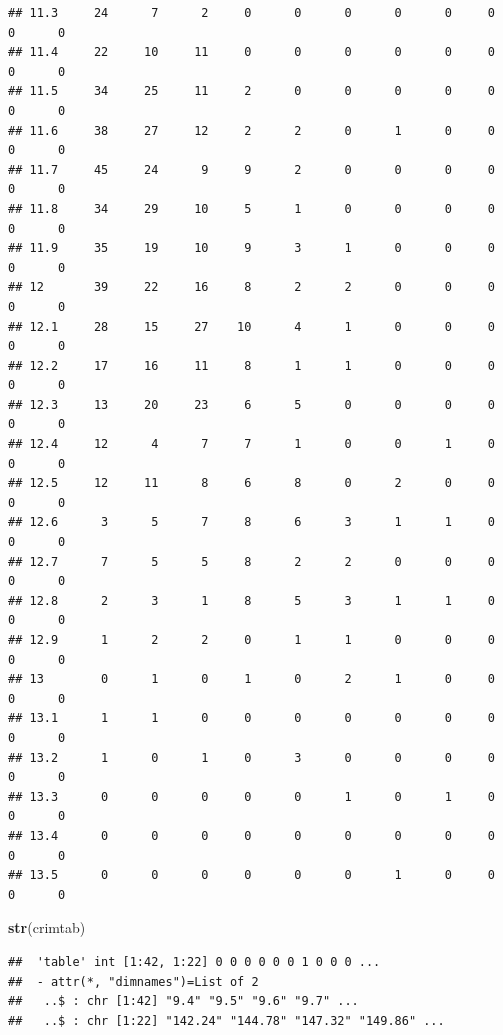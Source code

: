 \documentclass[
]{article}
\newenvironment{Shaded}{\begin{snugshade}}{\end{snugshade}}
\newcommand{\KeywordTok}[1]{\textcolor[rgb]{0.13,0.29,0.53}{\textbf{#1}}}
\newcommand{\NormalTok}[1]{#1}
\begin{document}
\begin{verbatim}
## 11.3     24      7      2     0      0      0      0      0     0      0      0
## 11.4     22     10     11     0      0      0      0      0     0      0      0
## 11.5     34     25     11     2      0      0      0      0     0      0      0
## 11.6     38     27     12     2      2      0      1      0     0      0      0
## 11.7     45     24      9     9      2      0      0      0     0      0      0
## 11.8     34     29     10     5      1      0      0      0     0      0      0
## 11.9     35     19     10     9      3      1      0      0     0      0      0
## 12       39     22     16     8      2      2      0      0     0      0      0
## 12.1     28     15     27    10      4      1      0      0     0      0      0
## 12.2     17     16     11     8      1      1      0      0     0      0      0
## 12.3     13     20     23     6      5      0      0      0     0      0      0
## 12.4     12      4      7     7      1      0      0      1     0      0      0
## 12.5     12     11      8     6      8      0      2      0     0      0      0
## 12.6      3      5      7     8      6      3      1      1     0      0      0
## 12.7      7      5      5     8      2      2      0      0     0      0      0
## 12.8      2      3      1     8      5      3      1      1     0      0      0
## 12.9      1      2      2     0      1      1      0      0     0      0      0
## 13        0      1      0     1      0      2      1      0     0      0      0
## 13.1      1      1      0     0      0      0      0      0     0      0      0
## 13.2      1      0      1     0      3      0      0      0     0      0      0
## 13.3      0      0      0     0      0      1      0      1     0      0      0
## 13.4      0      0      0     0      0      0      0      0     0      0      0
## 13.5      0      0      0     0      0      0      1      0     0      0      0
\end{verbatim}

\begin{Shaded}
\begin{Highlighting}[]
\KeywordTok{str}\NormalTok{(crimtab)}
\end{Highlighting}
\end{Shaded}

\begin{verbatim}
##  'table' int [1:42, 1:22] 0 0 0 0 0 0 1 0 0 0 ...
##  - attr(*, "dimnames")=List of 2
##   ..$ : chr [1:42] "9.4" "9.5" "9.6" "9.7" ...
##   ..$ : chr [1:22] "142.24" "144.78" "147.32" "149.86" ...
\end{verbatim}
\end{document}

